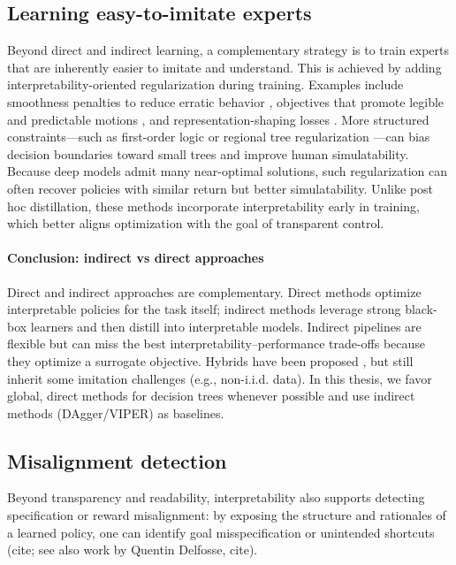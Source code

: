 \subsection{Learning easy-to-imitate experts}
Beyond direct and indirect learning, a complementary strategy is to train experts that are inherently easier to imitate and understand. This is achieved by adding interpretability-oriented regularization during training. Examples include smoothness penalties to reduce erratic behavior \cite{jia_advanced_2019}, objectives that promote legible and predictable motions \cite{dragan_legibility_2013}, and representation-shaping losses \cite{francois-lavet_combined_2019}. More structured constraints—such as first-order logic \cite{serafini_logic_2016} or regional tree regularization \cite{wu_optimizing_2019}—can bias decision boundaries toward small trees and improve human simulatability.
Because deep models admit many near-optimal solutions, such regularization can often recover policies with similar return but better simulatability. Unlike post hoc distillation, these methods incorporate interpretability early in training, which better aligns optimization with the goal of transparent control.

\paragraph{Conclusion: indirect vs direct approaches}
Direct and indirect approaches are complementary. Direct methods optimize interpretable policies for the task itself; indirect methods leverage strong black-box learners and then distill into interpretable models. Indirect pipelines are flexible but can miss the best interpretability–performance trade-offs because they optimize a surrogate objective. Hybrids have been proposed \cite{verma_imitation-projected_2019}, but still inherit some imitation challenges (e.g., non-i.i.d. data). In this thesis, we favor global, direct methods for decision trees whenever possible and use indirect methods (DAgger/VIPER) as baselines.

\subsection{Misalignment detection}
Beyond transparency and readability, interpretability also supports detecting specification or reward misalignment: by exposing the structure and rationales of a learned policy, one can identify goal misspecification or unintended shortcuts (cite; see also work by Quentin Delfosse, cite).

